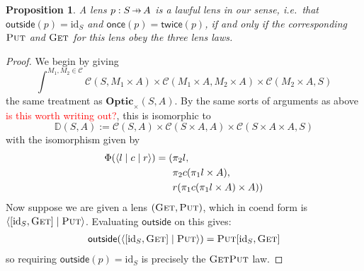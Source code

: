 \documentclass[11pt,a4paper]{article}
\theoremstyle{plain}
\newtheorem{proposition}[theorem]{Proposition}
\theoremstyle{definition}
\newcommand{\C}{\mathscr{C}}
\newcommand{\Optic}{\mathbf{Optic}}
\newcommand{\id}{\mathrm{id}}
\newcommand{\rep}[2]{{\ensuremath \left\langle #1 \mid #2 \right\rangle}}
\newcommand{\repthree}[3]{{\ensuremath \langle #1 \mid #2 \mid #3 \rangle}}
\newcommand{\fget}{\textsc{Get}}
\newcommand{\fput}{\textsc{Put}}
\newcommand{\outside}{\mathsf{outside}}
\newcommand{\once}{\mathsf{once}}
\newcommand{\twice}{\mathsf{twice}}
\newcommand{\hto}{\ensuremath{\,\mathaccent\shortmid\rightarrow\,}}
\newcommand{\todo}[1]{\textcolor{red}{\small #1}}
\begin{document}
\begin{proposition}\label{prop-OpticImpliesLensLaws}
  A lens $p : S \hto A$ is a lawful lens in our sense, i.e.\ that $\outside(p) = \id_S$ and $\once(p) = \twice(p)$, if and only if the corresponding $\fput$ and $\fget$ for this lens obey the three lens laws.
\end{proposition}
\begin{proof}
  We begin by giving
  \[ \int^{M_1, M_2 \in \C} \C(S, M_1 \times A) \times \C(M_1 \times A, M_2 \times A) \times \C(M_2 \times A, S)\]
  the same treatment as $\Optic_\times(S, A)$. By the same sorts of arguments as above \todo{is this worth writing out?}, this is isomorphic to
  \[\mathbb{D}(S, A) := \C(S, A) \times \C(S \times A, A) \times \C(S \times A \times A, S)\]
  with the isomorphism given by
  \begin{align*}
    \Phi(\repthree{l}{c}{r }) = (&\pi_2 l, \\
                                   &\pi_2 c (\pi_1 l \times A), \\
                                   &r(\pi_1 c (\pi_1 l \times A) \times A))
  \end{align*}
  Now suppose we are given a lens $(\fget, \fput)$, which in coend form is $\rep{[\id_S, \fget]}{\fput}$. Evaluating $\outside$ on this gives:
  \begin{align*}
    \outside(\rep{[\id_S, \fget]}{\fput}) = \fput [\id_S, \fget]
  \end{align*}
  so requiring $\outside(p) = \id_S$ is precisely the $\fget\fput$ law.


\end{proof}
\end{document}
